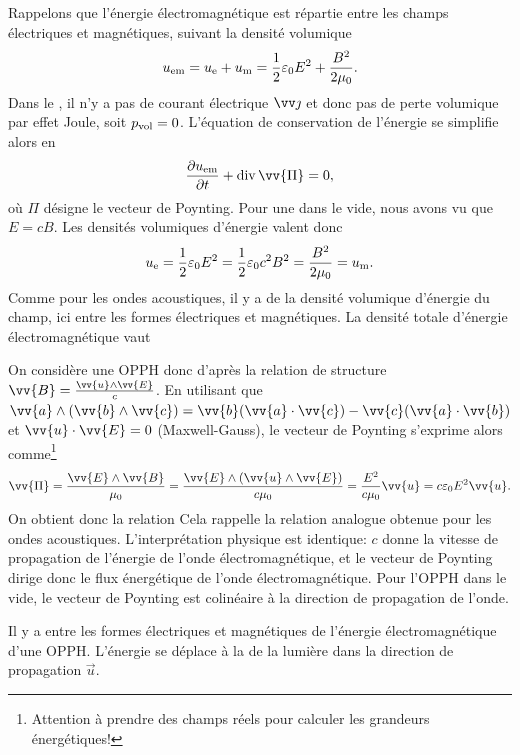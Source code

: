\documentclass[12pt,fancy]{cours}
\begin{document}
 Rappelons que l'énergie électromagnétique est répartie entre les champs électriques et magnétiques, suivant la densité volumique
$$
u_{\rm{em}}=u_{\rm e} + u_{\rm m} = \frac{1}{2}\varepsilon_0 E^2+\frac{B^2}{2\mu_0}.
$$
Dans le , il n'y a pas de courant  électrique $\j$ et donc pas de perte volumique par effet Joule, soit $p_{\rm vol} = 0$. L'équation de conservation de l'énergie se simplifie alors en 
$$
\dr{u_{\rm em}}{t} + \dive{\vv{\Pi}} = 0,
$$
où $\Pi$ désigne le vecteur de Poynting.
Pour une  dans le vide, nous avons vu que $E=cB$. Les densités volumiques d'énergie valent donc 
\begin{equation}
u_{\rm{e}}=\frac{1}{2}\varepsilon_0 E^2 = \frac{1}{2}\varepsilon_0 c^2 B^2 =  \frac{B^2}{2\mu_0} = u_{\rm{m}}.
\end{equation}
Comme pour les ondes acoustiques, il y a  de la densité volumique d'énergie du champ, ici entre les formes électriques et magnétiques. La densité totale d'énergie électromagnétique vaut 

On considère une OPPH donc d'après la relation de structure $\vv{B}=\frac{\vv{u}\pv\vv{E}}{c}$. En utilisant que $\vv{a}\pv(\vv{b}\pv\vv{c})=\vv{b}(\vv{a}\cdot\vv{c})-\vv{c}(\vv{a}\cdot\vv{b})$ et $\vv{u}\cdot\vv{E}=0$ (Maxwell-Gauss), le vecteur de Poynting s'exprime alors comme\footnote{Attention à  prendre des champs réels pour calculer les grandeurs énergétiques!}
\begin{equation}
\vv{\Pi}=\frac{\vv{E}\pv\vv{B}}{\mu_0}=\frac{\vv{E}\pv(\vv{u}\pv\vv{E})}{c\mu_0}=\frac{E^2}{c\mu_0}\vv{u}=c \varepsilon_0 E^2\vv{u}.
\end{equation}
 On obtient donc la relation
Cela rappelle la relation analogue obtenue pour les ondes acoustiques. L'interprétation physique est identique: $c$ donne la vitesse de propagation de l'énergie de l'onde électromagnétique, et le vecteur de Poynting dirige donc le flux énergétique de l'onde électromagnétique. Pour l'OPPH dans le vide, le vecteur de Poynting est colinéaire à la direction de propagation de l'onde.

\begin{prop}\label{prop:}
  Il y a  entre les formes électriques et magnétiques de l'énergie électromagnétique d'une OPPH. L'énergie se déplace à la  de la lumière dans la direction de propagation $\Vec{u}$.
\end{prop}
\end{document}
